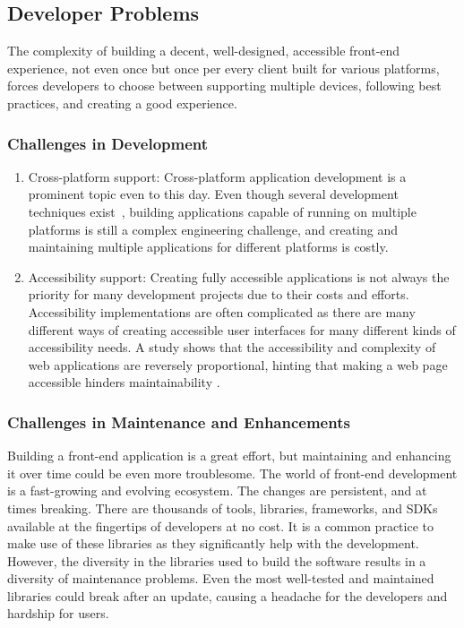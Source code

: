 \subsection{Developer Problems}

The complexity of building a decent, well-designed, accessible front-end experience, not even once but once per every client built for various platforms, forces developers to choose between supporting multiple devices, following best practices, and creating a good experience.

\subsubsection{Challenges in Development}
\begin{enumerate}
  \item Cross-platform support:
  Cross-platform application development is a prominent topic even to this day. Even though several development techniques exist~\cite{PWAs}, building applications capable of running on multiple platforms is still a complex engineering challenge, and creating and maintaining multiple applications for different platforms is costly. 
  \item Accessibility support:
  Creating fully accessible applications is not always the priority for many development projects due to their costs and efforts. Accessibility implementations are often complicated as there are many different ways of creating accessible user interfaces for many different kinds of accessibility needs. A study shows that the accessibility and complexity of web applications are reversely proportional, hinting that making a web page accessible hinders maintainability \cite{WebNotForAll}.
\end{enumerate}

\subsubsection{Challenges in Maintenance and Enhancements}
Building a front-end application is a great effort, but maintaining and enhancing it over time could be even more troublesome. The world of front-end development is a fast-growing and evolving ecosystem. The changes are persistent, and at times breaking. There are thousands of tools, libraries, frameworks, and SDKs available at the fingertips of developers at no cost. It is a common practice to make use of these libraries as they significantly help with the development. However, the diversity in the libraries used to build the software results in a diversity of maintenance problems. Even the most well-tested and maintained libraries could break after an update, causing a headache for the developers and hardship for users.


